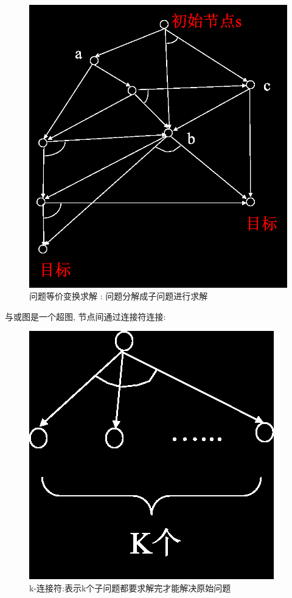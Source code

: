 \documentclass[UTF8,a4paper]{ctexart}
\begin{document}
\begin{figure}[H]
	\centering
	\includegraphics[scale = 0.3]{assets/ArtificialIntelligence_76d7c.png}
	\caption{问题等价变换求解 : 问题分解成子问题进行求解}
\end{figure}

与或图是一个超图, 节点间通过连接符连接:
\begin{figure}[H]
	\centering
	\includegraphics[scale = 0.3]{assets/ArtificialIntelligence_ed995.png}
	\caption{k-连接符:表示k个子问题都要求解完才能解决原始问题}
\end{figure}
\end{document}
